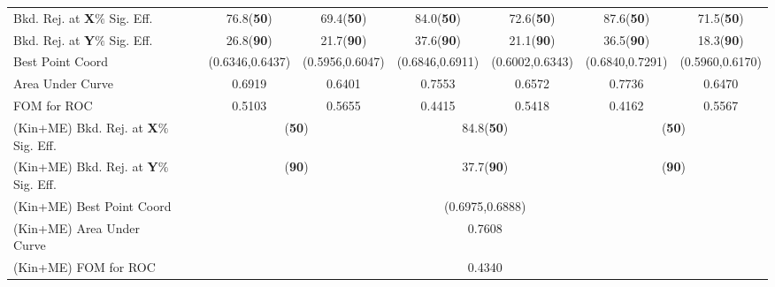 {\begin{table}[ht!]
{\begin{tabular}{| l | c | c | c | c | c | c | c | c |}
Bkd. Rej. at \textbf{X}$\%$ Sig. Eff. &&& 76.8(\textbf{50}) & 69.4(\textbf{50}) & 84.0(\textbf{50}) & 72.6(\textbf{50}) & 87.6(\textbf{50}) & 71.5(\textbf{50}) \\
Bkd. Rej. at \textbf{Y}$\%$ Sig. Eff. &&& 26.8(\textbf{90}) & 21.7(\textbf{90}) & 37.6(\textbf{90}) & 21.1(\textbf{90}) & 36.5(\textbf{90}) & 18.3(\textbf{90}) \\
Best Point Coord &&& (0.6346,0.6437) & (0.5956,0.6047) & (0.6846,0.6911) & (0.6002,0.6343) & (0.6840,0.7291) & (0.5960,0.6170) \\
Area Under Curve &&& 0.6919 & 0.6401 & 0.7553 & 0.6572 & 0.7736 & 0.6470 \\
FOM for ROC & & & 0.5103 & 0.5655 & 0.4415 & 0.5418 & 0.4162 & 0.5567 \\ \hline
(Kin+ME) Bkd. Rej. at \textbf{X}$\%$ Sig. Eff. & \multicolumn{2}{c|}{} & \multicolumn{2}{c|}{(\textbf{50})} & \multicolumn{2}{c|}{84.8(\textbf{50})} & \multicolumn{2}{c|}{(\textbf{50})} \\
(Kin+ME) Bkd. Rej. at \textbf{Y}$\%$ Sig. Eff. & \multicolumn{2}{c|}{} & \multicolumn{2}{c|}{(\textbf{90})} & \multicolumn{2}{c|}{37.7(\textbf{90})} & \multicolumn{2}{c|}{(\textbf{90})} \\
(Kin+ME) Best Point Coord & \multicolumn{2}{c|}{} & \multicolumn{2}{c|}{} & \multicolumn{2}{c|}{(0.6975,0.6888)} & \multicolumn{2}{c|}{} \\
(Kin+ME) Area Under Curve & \multicolumn{2}{c|}{} & \multicolumn{2}{c|}{} & \multicolumn{2}{c|}{0.7608} & \multicolumn{2}{c|}{} \\
(Kin+ME) FOM for ROC & \multicolumn{2}{c|}{} & \multicolumn{2}{c|}{} & \multicolumn{2}{c|}{0.4340} & \multicolumn{2}{c|}{} \\ \hline
    \end{tabular} }
\end{table}
}


